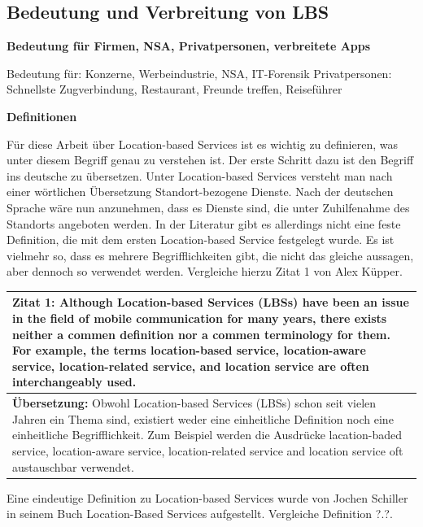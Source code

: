 \subsection{Bedeutung und Verbreitung von LBS}

\textbf{Bedeutung für Firmen, NSA, Privatpersonen, verbreitete Apps}

Bedeutung für: Konzerne, Werbeindustrie, NSA, IT-Forensik \linebreak
Privatpersonen: Schnellste Zugverbindung, Restaurant, Freunde treffen, Reiseführer


\textbf{Definitionen}

Für diese Arbeit über Location-based Services ist es wichtig zu definieren, was unter diesem Begriff genau zu verstehen ist. Der erste Schritt dazu ist den Begriff ins deutsche zu übersetzen. Unter Location-based Services versteht man nach einer wörtlichen Übersetzung Standort-bezogene Dienste. Nach der deutschen Sprache wäre nun anzunehmen, dass es Dienste sind, die unter Zuhilfenahme des Standorts angeboten werden. In der Literatur gibt es allerdings nicht eine feste Definition, die mit dem ersten Location-based Service festgelegt wurde. Es ist vielmehr so, dass es mehrere Begrifflichkeiten gibt, die nicht das gleiche aussagen, aber dennoch so verwendet werden. Vergleiche hierzu Zitat 1 von Alex Küpper.

\begin{table}[h]
	\centering
	\begin{tabular}{|p{16cm}|}\hline
		\textbf{Zitat 1:} \glqq Although Location-based Services (LBSs) have been an issue in the field of mobile communication for many years, there exists neither a commen definition nor a commen terminology for them. For example, the terms location-based service, location-aware service, location-related service, and location service are often interchangeably used. \cite[S.1]{Kuepper2005} \\ \hline
		\textbf{Übersetzung:} Obwohl Location-based Services (LBSs) schon seit vielen Jahren ein Thema sind, existiert weder eine einheitliche Definition noch eine einheitliche Begrifflichkeit. Zum Beispiel werden die Ausdrücke lacation-baded service, location-aware service, location-related service and location service oft austauschbar verwendet. \\ \hline
	\end{tabular}
\end{table}


Eine eindeutige Definition zu Location-based Services wurde von Jochen Schiller in seinem Buch \glqq Location-Based Services \grqq aufgestellt. Vergleiche Definition ?.?.

